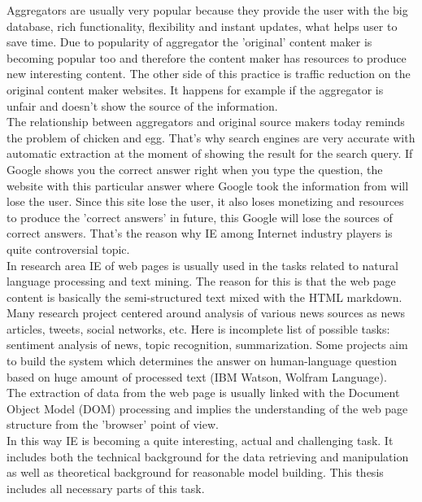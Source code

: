 Aggregators are usually very popular because they provide the user with the big database, rich functionality, flexibility and instant updates, what helps user to save time. Due to popularity of aggregator the 'original' content maker is becoming popular too and therefore the content maker has resources to produce new interesting content. The other side of this practice is traffic reduction on the original content maker websites. It happens for example if the aggregator is unfair and doesn't show the source of the information. \\

The relationship between aggregators and original source makers today reminds the problem of chicken and egg. That's why search engines are very accurate with automatic extraction at the moment of showing the result for the search query. If Google shows you the correct answer right when you type the question, the website with this particular answer where Google took the information from will lose the user. Since this site lose the user, it also loses monetizing and resources to produce the 'correct answers' in future, this Google will lose the sources of correct answers. That's the reason why IE among Internet industry players is quite controversial topic.\\

In research area IE of web pages is usually used in the tasks related to natural language processing and text mining. The reason for this is that the web page content is basically the semi-structured text mixed with the HTML markdown. Many research project centered around analysis of various news sources as news articles, tweets, social networks, etc. Here is incomplete list of possible tasks: sentiment analysis of news, topic recognition, summarization. Some projects aim to build the system which determines the answer on human-language question based on huge amount of processed text (IBM Watson, Wolfram Language).\\      

The extraction of data from the web page is usually linked with the Document Object Model (DOM) processing and implies the understanding of the web page structure from the 'browser' point of view. \\

In this way IE is becoming a quite interesting, actual and challenging task. It includes both the technical background for the data retrieving and manipulation as well as theoretical background for reasonable model building. This thesis includes all necessary parts of this task.

